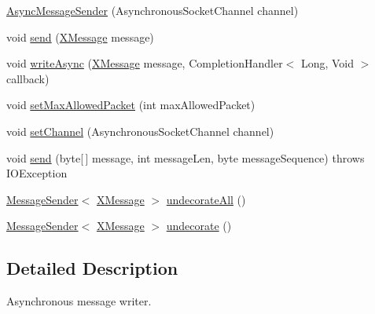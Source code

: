 \begin{DoxyCompactItemize}
\item 
\mbox{\hyperlink{classcom_1_1mysql_1_1cj_1_1protocol_1_1x_1_1_async_message_sender_a60d8f512862f503f0e63da3bad608966}{Async\+Message\+Sender}} (Asynchronous\+Socket\+Channel channel)
\item 
void \mbox{\hyperlink{classcom_1_1mysql_1_1cj_1_1protocol_1_1x_1_1_async_message_sender_a6fbc4d4b6b0e9a94cdec20e3c9efb904}{send}} (\mbox{\hyperlink{classcom_1_1mysql_1_1cj_1_1protocol_1_1x_1_1_x_message}{X\+Message}} message)
\item 
void \mbox{\hyperlink{classcom_1_1mysql_1_1cj_1_1protocol_1_1x_1_1_async_message_sender_a405a11dfc5f673ba7e8dbb1410bf25f9}{write\+Async}} (\mbox{\hyperlink{classcom_1_1mysql_1_1cj_1_1protocol_1_1x_1_1_x_message}{X\+Message}} message, Completion\+Handler$<$ Long, Void $>$ callback)
\item 
void \mbox{\hyperlink{classcom_1_1mysql_1_1cj_1_1protocol_1_1x_1_1_async_message_sender_a9350fb34edd02d90eebe96812dd85e25}{set\+Max\+Allowed\+Packet}} (int max\+Allowed\+Packet)
\item 
void \mbox{\hyperlink{classcom_1_1mysql_1_1cj_1_1protocol_1_1x_1_1_async_message_sender_aa71e26100605a3dbb3f575c839769d3e}{set\+Channel}} (Asynchronous\+Socket\+Channel channel)
\item 
void \mbox{\hyperlink{classcom_1_1mysql_1_1cj_1_1protocol_1_1x_1_1_async_message_sender_a8dd20b5008f9f8f6a5d294269b0d8e0e}{send}} (byte\mbox{[}$\,$\mbox{]} message, int message\+Len, byte message\+Sequence)  throws I\+O\+Exception 
\item 
\mbox{\hyperlink{interfacecom_1_1mysql_1_1cj_1_1protocol_1_1_message_sender}{Message\+Sender}}$<$ \mbox{\hyperlink{classcom_1_1mysql_1_1cj_1_1protocol_1_1x_1_1_x_message}{X\+Message}} $>$ \mbox{\hyperlink{classcom_1_1mysql_1_1cj_1_1protocol_1_1x_1_1_async_message_sender_ad00ea2b9a6d74feb32a301410fc829f0}{undecorate\+All}} ()
\item 
\mbox{\hyperlink{interfacecom_1_1mysql_1_1cj_1_1protocol_1_1_message_sender}{Message\+Sender}}$<$ \mbox{\hyperlink{classcom_1_1mysql_1_1cj_1_1protocol_1_1x_1_1_x_message}{X\+Message}} $>$ \mbox{\hyperlink{classcom_1_1mysql_1_1cj_1_1protocol_1_1x_1_1_async_message_sender_a4e7623346f23221fb9ff562c11c851e6}{undecorate}} ()
\end{DoxyCompactItemize}


\subsection{Detailed Description}
Asynchronous message writer. 

